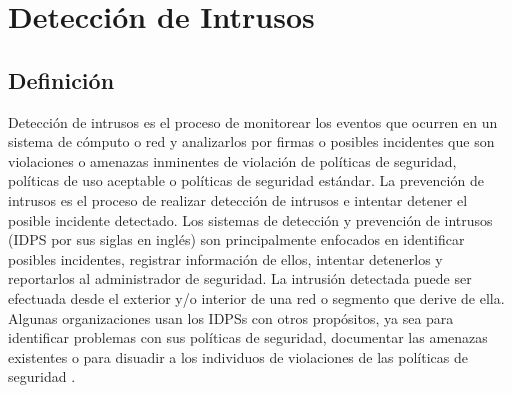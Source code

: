 \section{Detección de Intrusos}

\subsection{Definición}

Detección de intrusos es el proceso de monitorear los eventos que ocurren en un sistema de cómputo o red y analizarlos por firmas o posibles incidentes que son violaciones o amenazas inminentes de violación de políticas de seguridad, políticas de uso aceptable o políticas de seguridad estándar. La prevención de intrusos es el proceso de realizar detección de intrusos e intentar detener el posible incidente detectado. Los sistemas de detección y prevención de intrusos (IDPS por sus siglas en inglés) son principalmente enfocados en identificar posibles incidentes, registrar información de ellos, intentar detenerlos y reportarlos al administrador de seguridad. La intrusión detectada puede ser efectuada desde el exterior y/o interior de una red o segmento que derive de ella. Algunas organizaciones usan los IDPSs con otros propósitos, ya sea para identificar problemas con sus políticas de seguridad, documentar las amenazas existentes o para disuadir a los individuos de violaciones de las políticas de seguridad \cite{nist94}. \\